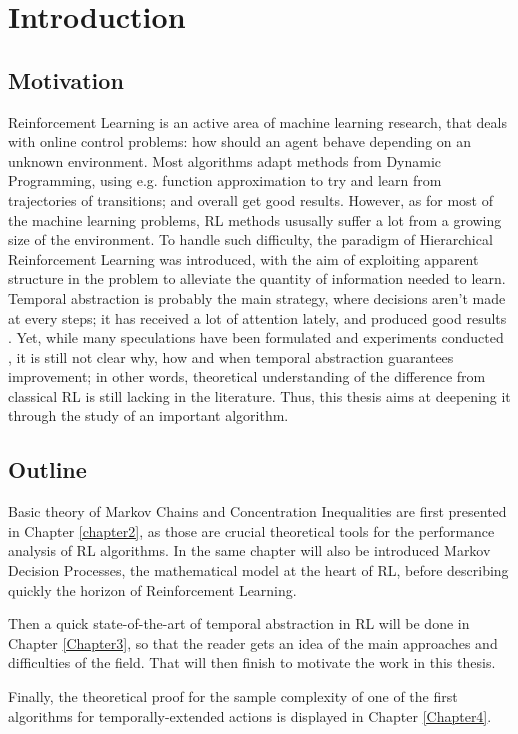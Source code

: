 
\chapter{Introduction}
\label{chapter1}




\section{Motivation}

Reinforcement Learning \citep{sutton_reinforcement_2018} is an active area of machine learning research, that deals with online control problems: how should an agent behave depending on an unknown environment. Most algorithms adapt methods from Dynamic Programming, using e.g. function approximation to try and learn from trajectories of transitions; and overall get good results. However, as for most of the machine learning problems, RL methods ususally suffer a lot from a growing size of the environment. To handle such difficulty, the paradigm of Hierarchical Reinforcement Learning was introduced, with the aim of exploiting apparent structure in the problem to alleviate the quantity of information needed to learn. Temporal abstraction \citep{sutton_between_1999} is probably the main strategy, where decisions aren't made at every steps; it has received a lot of attention lately, and produced good results \citep{fruit_exploration--exploitation_2017, bacon_option-critic_2016, machado_temporal_2021}. Yet, while many speculations have been formulated and experiments conducted \citep{nachum_why_2019,jong_utility_2008}, it is still not clear why, how and when temporal abstraction guarantees improvement; in other words, theoretical understanding of the difference from classical RL is still lacking in the literature. Thus, this thesis aims at deepening it through the study of an important algorithm.


\section{Outline}

Basic theory of Markov Chains and Concentration Inequalities are first presented in Chapter \ref{chapter2}, as those are crucial theoretical tools for the performance analysis of RL algorithms. In the same chapter will also be introduced Markov Decision Processes, the mathematical model at the heart of RL, before describing quickly the horizon of Reinforcement Learning.

Then a quick state-of-the-art of temporal abstraction in RL will be done in Chapter \ref{Chapter3}, so that the reader gets an idea of the main approaches and difficulties of the field. That will then finish to motivate the work in this thesis.

Finally, the theoretical proof for the sample complexity of one of the first algorithms for temporally-extended actions is displayed in Chapter \ref{Chapter4}.

